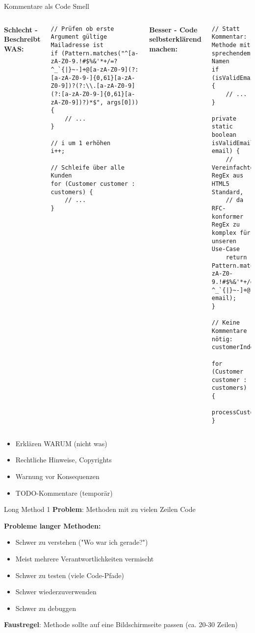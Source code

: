 \begin{frame}[fragile]{Kommentare als Code Smell}
  \begin{columns}[T]
    \textbf{Schlecht - Beschreibt WAS:}
    \begin{lstlisting}[style=java, basicstyle=\tiny\ttfamily]
// Prüfen ob erste Argument gültige Mailadresse ist
if (Pattern.matches("^[a-zA-Z0-9.!#$%&'*+/=?^_`{|}~-]+@[a-zA-Z0-9](?:[a-zA-Z0-9-]{0,61}[a-zA-Z0-9])?(?:\\.[a-zA-Z0-9](?:[a-zA-Z0-9-]{0,61}[a-zA-Z0-9])?)*$", args[0])) {
    // ...
}

// i um 1 erhöhen
i++;

// Schleife über alle Kunden
for (Customer customer : customers) {
    // ...
}
    \end{lstlisting}

    \textbf{Besser - Code selbsterklärend machen:}
    \begin{lstlisting}[style=java, basicstyle=\tiny\ttfamily]
// Statt Kommentar: Methode mit sprechendem Namen
if (isValidEmailAddress(args[0])) {
    // ...
}

private static boolean isValidEmailAddress(String email) {
    // Vereinfachter RegEx aus HTML5 Standard,
    // da RFC-konformer RegEx zu komplex für unseren Use-Case
    return Pattern.matches("^[a-zA-Z0-9.!#$%&'*+/=?^_`{|}~-]+@...", email);
}

// Keine Kommentare nötig:
customerIndex++;

for (Customer customer : customers) {
    processCustomerOrder(customer);
}
    \end{lstlisting}
  \end{columns}

  \begin{itemize}
    \item Erklären WARUM (nicht was)
    \item Rechtliche Hinweise, Copyrights
    \item Warnung vor Konsequenzen
    \item TODO-Kommentare (temporär)
  \end{itemize}
\end{frame}

\begin{frame}[fragile]{Long Method 1}
  \textbf{Problem}: Methoden mit zu vielen Zeilen Code

  \textbf{Probleme langer Methoden:}
  \begin{itemize}
    \item Schwer zu verstehen ("Wo war ich gerade?")
    \item Meist mehrere Verantwortlichkeiten vermischt
    \item Schwer zu testen (viele Code-Pfade)
    \item Schwer wiederzuverwenden
    \item Schwer zu debuggen
  \end{itemize}

  \textbf{Faustregel}: Methode sollte auf eine Bildschirmseite passen (ca. 20-30 Zeilen)
\end{frame}

